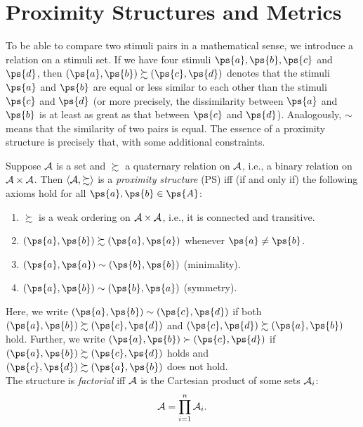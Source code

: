 \section{Proximity Structures and Metrics} \label{chap-ps-metrics}
To be able to compare two stimuli pairs in a mathematical sense, we introduce a relation on a stimuli set.
If we have four stimuli $\ps{a}, \ps{b}, \ps{c}$ and $\ps{d}$, then $(\ps{a},\ps{b})\succsim(\ps{c},\ps{d})$ denotes that the stimuli $\ps{a}$ and $\ps{b}$ are equal or less similar to each other than the stimuli $\ps{c}$ and $\ps{d}$ (or more precisely, the dissimilarity between $\ps{a}$ and $\ps{b}$ is at least as great as that between $\ps{c}$ and $\ps{d}$). Analogously, $\sim$ means that the similarity of two pairs is equal.
The essence of a proximity structure is precisely that, with some additional constraints.

\begin{defi}  \label{def-prox-struct} %
	Suppose $\mathcal{A}$ is a set and $\succsim$ a quaternary relation on $\mathcal{A}$, i.e., a binary relation on $\mathcal{A} \times \mathcal{A}$. Then $\langle \mathcal{A}, \succsim \rangle$ is a \emph{proximity structure} (PS) iff (if and only if) the following axioms hold for all $\ps{a}, \ps{b} \in \ps{A}$:
	\begin{enumerate}
		\item $\succsim$ is a weak ordering on $\mathcal{A} \times \mathcal{A}$, i.e., it is connected and transitive.
		\item $(\ps{a}, \ps{b}) \succsim (\ps{a}, \ps{a})$ whenever $\ps{a} \neq \ps{b}$.
		\item $(\ps{a}, \ps{a}) \sim (\ps{b}, \ps{b})$ (minimality).
		\item $(\ps{a}, \ps{b}) \sim (\ps{b}, \ps{a})$ (symmetry).
	\end{enumerate}
  Here, we write $(\ps{a}, \ps{b}) \sim (\ps{c}, \ps{d})$ if both $(\ps{a}, \ps{b}) \succsim (\ps{c}, \ps{d})$ and $(\ps{c}, \ps{d}) \succsim (\ps{a}, \ps{b})$ hold.
  Further, we write $(\ps{a}, \ps{b}) \succ (\ps{c}, \ps{d})$ if $(\ps{a}, \ps{b}) \succsim (\ps{c}, \ps{d})$ holds and $(\ps{c}, \ps{d}) \succsim (\ps{a}, \ps{b})$ does not hold.\\
  The structure is \emph{factorial} iff $\mathcal{A}$ is the Cartesian product of some sets $\mathcal{A}_i$:  \label{def-fact-prox-struct}
	$$
		\mathcal{A} = \prod_{i=1}^{n} \mathcal{A}_i.
	$$
\end{defi}

